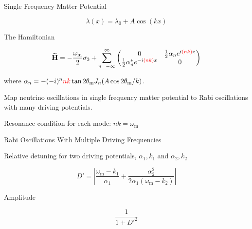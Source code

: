 \begin{frame}{Single Frequency Matter Potential}



\begin{equation*}
\lambda(x) = \lambda_0 +  A \cos(k x )
\end{equation*}


\begin{tcolorbox}[title=Hamiltonian in Rabi Basis]

The Hamiltonian


\begin{equation*}
\mathbf{\widetilde H}= -\frac{\omega_{\mathrm m}}{2}\sigma_3 + \sum_{n=-\infty}^{\infty} \begin{pmatrix}
0 & \frac{1}{2}  \alpha_n e^{i  {\color{red} (n k) } x}\\
\frac{1}{2}  \alpha_n^* e^{ -i  {\color{red} (n k) } x} & 0
\end{pmatrix}
\end{equation*}


where $\alpha_n =  - (-i)^n  {\color{red}n  k} \tan 2\theta_{\mathrm{m}}  J_n ( A \cos 2\theta_{\mathrm{m}} / k )$.


\end{tcolorbox}







\begin{tcolorbox}
\centering
Map neutrino oscillations in single frequency matter potential to Rabi oscillations with many driving potentials.
\end{tcolorbox}

\pause
\begin{tcolorbox}
\centering
Resonance condition for each mode: $nk=\omega_{\mathrm m}$
\end{tcolorbox}




\end{frame}



\begin{frame}{Rabi Oscillations With Multiple Driving Frequencies}




Relative detuning for two driving potentials, $\alpha_1,k_1$ and $\alpha_2, k_2$

\begin{equation*}
D' =  \left\vert \frac{\omega_{\mathrm m} - k_1 }{\alpha_1} + \frac{\alpha_2^2}{2\alpha_1(\omega_{\mathrm m}-k_2)} \right\vert
\end{equation*}

Amplitude

\begin{equation*}
   \frac{1}{1+D'^2}
\end{equation*}

\end{frame}


